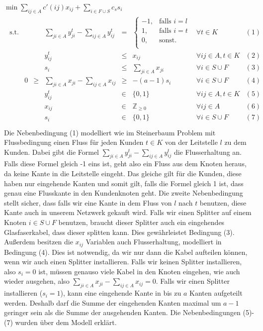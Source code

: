 \documentclass[11pt,a4paper]{article}
\newcommand{\Z}{\mathbb{Z}}
\theoremstyle{my_th_style1}
\begin{document}
 \bigskip
 $\min \displaystyle\sum_{ij \in A} c'(ij) x_{ij} + \displaystyle\sum_{i \in F \cup S} c_s s_i $
 \begin{align}\label{model_p2mpf}
 \begin{array}{rcrcrcll}
 \textrm{s.t.}  
&& &\displaystyle\sum_{ji \in A} y_{ji}^t - \displaystyle\sum_{ij \in A} y_{ij}^t& = & \left\{\begin{array}{cl} 
 -1, & \text{falls } i=l\\ 
 1, & \text{falls } i=t\\ 
 0, & \text{sonst.}\\ 
 \end{array}
 \right. & \forall t \in K & (1) \\
 &&& y_{ij}^t & \leq & x_{ij} & \forall ij \in A, t\in K & (2)\\
 &&& s_i &\leq& \displaystyle\sum_{ji \in A} x_{ji}& \forall  i \in S \cup F& (3)\\ 
 &0&\geq&\displaystyle\sum_{ji \in A} x_{ji} - \displaystyle\sum_{ij \in A} x_{ij}&\geq& -(a-1)s_i & \forall i \in S \cup F& (4)\\
 &&& y_{ij}^t & \in & \{0,1 \}& \forall ij \in A, t \in K & (5)\\
 &&& x_{ij} & \in & \Z _{\geq 0}& \forall ij \in A & (6)\\
 &&& s_i & \in & \{ 0,1 \} & \forall i \in S \cup F & (7) \\
 \end{array}
 \end{align}
Die Nebenbedingung (1) modelliert wie im Steinerbaum Problem mit Flussbedingung einen Fluss für jeden Kunden $t \in K$ von der Leitstelle $l$ zu dem Kunden.
Dabei gibt die Formel $\displaystyle\sum_{ji \in A} y_{ji}^t - \displaystyle\sum_{ij \in A} y_{ij}^t$ die Flusserhaltung an.
Falls diese Formel gleich -1 eins ist, geht also ein Fluss aus dem Knoten heraus, da keine Kante in die Leitstelle eingeht.
Das gleiche gilt für die Kunden, diese haben nur eingehende Kanten und somit gilt, falls die Formel gleich 1 ist, dass genau eine Flusskante in den Kundenknoten geht.
Die zweite Nebenbedingung stellt sicher, dass falls wir eine Kante in dem Fluss von $l$ nach $t$ benutzen, diese Kante auch in unserem Netzwerk gekauft wird.
Falls wir einen Splitter auf einem Knoten $i \in S \cup F$ benutzen, braucht dieser Splitter auch ein eingehendes Glasfaserkabel, dass dieser splitten kann.
Dies gewährleistet Bedingung (3).
Außerdem besitzen die $x_{ij}$ Variablen auch Flusserhaltung, modelliert in Bedingung (4).
Dies ist notwendig, da wir nur dann die Kabel aufteilen können, wenn wir auch einen Splitter installieren.
Falls wir keinen Splitter installieren, also $s_i=0$ ist, müssen genauso viele Kabel in den Knoten eingehen, wie auch wieder ausgehen, also $\displaystyle\sum_{ji \in A} x_{ji} - \displaystyle\sum_{ij \in A} x_{ij}=0$.
Falls wir einen Splitter installieren ($s_i=1$), kann eine eingehende Kante in bis zu $a$ Kanten aufgeteilt werden.
Deshalb darf die Summe der eingehenden Kanten maximal um \(a-1\) geringer sein als die Summe der ausgehenden Kanten.
Die Nebenbedingungen (5)-(7) wurden über dem Modell erklärt.
  
\end{document}
